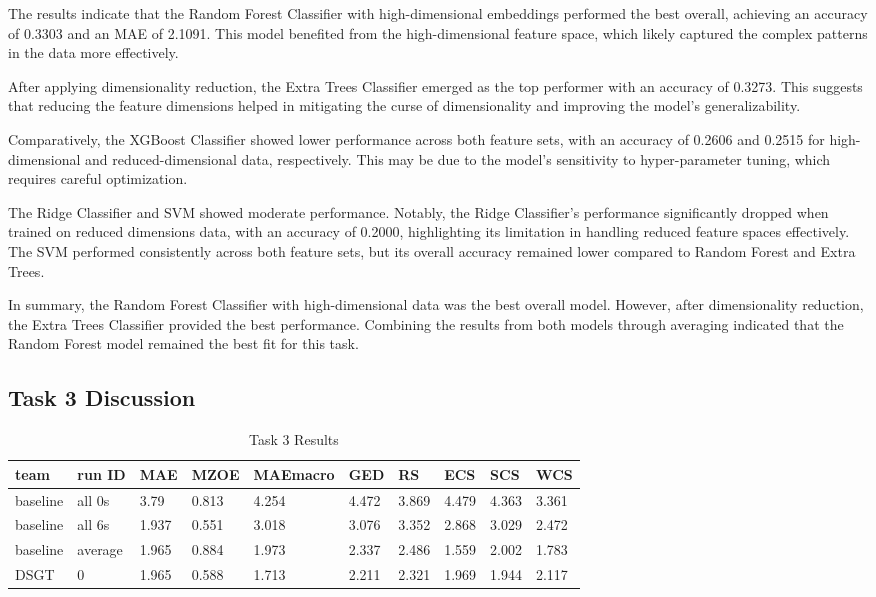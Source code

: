 \documentclass[]{style/ceurart}
\begin{document}
The results indicate that the Random Forest Classifier with high-dimensional embeddings performed the best overall, achieving an accuracy of 0.3303 and an MAE of 2.1091. This model benefited from the high-dimensional feature space, which likely captured the complex patterns in the data more effectively.

After applying dimensionality reduction, the Extra Trees Classifier emerged as the top performer with an accuracy of 0.3273. This suggests that reducing the feature dimensions helped in mitigating the curse of dimensionality and improving the model's generalizability.

Comparatively, the XGBoost Classifier showed lower performance across both feature sets, with an accuracy of 0.2606 and 0.2515 for high-dimensional and reduced-dimensional data, respectively. This may be due to the model's sensitivity to hyper-parameter tuning, which requires careful optimization.

The Ridge Classifier and SVM showed moderate performance. Notably, the Ridge Classifier's performance significantly dropped when trained on reduced dimensions data, with an accuracy of 0.2000, highlighting its limitation in handling reduced feature spaces effectively. The SVM performed consistently across both feature sets, but its overall accuracy remained lower compared to Random Forest and Extra Trees.

In summary, the Random Forest Classifier with high-dimensional data was the best overall model. However, after dimensionality reduction, the Extra Trees Classifier provided the best performance. Combining the results from both models through averaging indicated that the Random Forest model remained the best fit for this task.

\subsection{Task 3 Discussion}

\begin{table}[h]
\caption{Task 3 Results}
\begin{tabular}{llllllllll}
team     & run ID  & MAE   & MZOE  & MAEmacro & GED   & RS    & ECS   & SCS   & WCS   \\ \hline
baseline & all 0s  & 3.79  & 0.813 & 4.254    & 4.472 & 3.869 & 4.479 & 4.363 & 3.361 \\
baseline & all 6s  & 1.937 & 0.551 & 3.018    & 3.076 & 3.352 & 2.868 & 3.029 & 2.472 \\
baseline & average & 1.965 & 0.884 & 1.973    & 2.337 & 2.486 & 1.559 & 2.002 & 1.783 \\ \hline
DSGT     & 0       & 1.965 & 0.588 & 1.713    & 2.211 & 2.321 & 1.969 & 1.944 & 2.117
\end{tabular}
\end{table}
\end{document}
